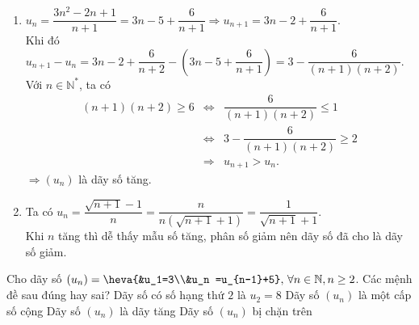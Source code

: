 \begin{ex}
{\begin{enumerate}
			\item $u_n=\dfrac{3 n^2-2 n+1}{n+1}=3 n-5+\dfrac{6}{n+1} \Rightarrow u_{n+1}=3 n-2+\dfrac{6}{n+1}$.\\ 
			Khi  đó $u_{n+1}-u_n=3 n-2+\dfrac{6}{n+2}-\left(3 n-5+\dfrac{6}{n+1}\right)=3-\dfrac{6}{(n+1)(n+2)}$.\\
			Với $n  \in \mathbb{N}^*$, ta có
			 \allowdisplaybreaks
			\begin{eqnarray*}
				(n+1)(n+2) \geq 6 &\Leftrightarrow& \dfrac{6}{(n+1)(n+2)} \leq 1  \\
				&\Leftrightarrow& 3-\dfrac{6}{(n+1)(n+2)} \geq  2\\
				 &\Rightarrow& u_{n+1}>u_n.
			\end{eqnarray*}
			$\Rightarrow\left(u_n\right)$  là dãy số tăng.
			\item Ta có $u_n=\dfrac{\sqrt{n+1}-1}{n}=\dfrac{n}{n(\sqrt{n+1}+1)}=\dfrac{1}{\sqrt{n+1}+1}$.\\ 
			Khi $n$ tăng thì dễ  thấy mẫu số tăng, phân số giảm nên dãy số đã cho là dãy số giảm.
		\end{enumerate}
	} 
\end{ex}

\begin{ex}%
 Cho dãy số $(u_n)=\heva{&u_1=3\\&u_n =u_{n-1}+5},\,\forall n\in\mathbb{N},n\ge  2$. Các mệnh đề sau đúng hay sai?
  \choiceTF
  {\True Dãy số có số hạng  thứ $2$ là $u_2=8$}
  {\True  Dãy số $(u_n)$ là một cấp số cộng}
  {\True Dãy số $(u_n)$ là  dãy tăng}
  {Dãy số $(u_n)$ bị chặn trên} 
\end{ex}


